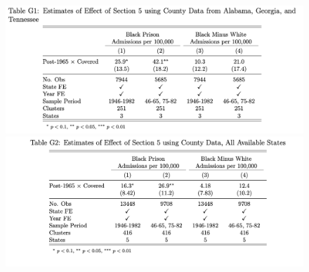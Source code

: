 \documentclass[12pt]{article}
\begin{document}
\begin{figure}[h!]
	\centering
	\includegraphics[width=6.3in]{../../60_appendix_cty_results/table_g1.png} \\
	\includegraphics[width=6.3in]{../../60_appendix_cty_results/table_g2.png}
\end{figure}
\end{document}
